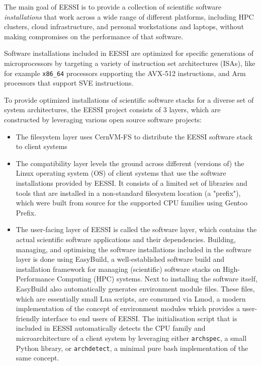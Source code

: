 The main goal of EESSI is to provide a collection of scientific software \emph{installations} that work across a wide range of
different platforms, including HPC clusters, cloud infrastructure, and personal workstations and laptops, without making
compromises on the performance of that software.

Software installations included in EESSI are optimized for specific generations of microprocessors by targeting a
variety of instruction set architectures (ISAs), like for example \texttt{x86\_64} processors supporting the
AVX-512 instructions, and Arm processors that support SVE instructions.

To provide optimized installations of scientific software stacks for a diverse set of system architectures, the EESSI
project consists of 3 layers, which are constructed by leveraging various open source software projects:
\begin{itemize}
\item The filesystem layer uses CernVM-FS to distribute the EESSI software stack to client systems
\item The compatibility layer levels the ground across different (versions of) the Linux operating system (OS)
      of client systems that use the software installations provided by EESSI. It consists of a limited set of libraries
      and tools that are installed in a non-standard filesystem location (a "prefix"), which were built from source for
      the supported CPU families using Gentoo Prefix.
\item The user-facing layer of EESSI is called the software layer, which contains the actual scientific software applications
      and their dependencies. Building, managing, and optimising the software installations included in the software
      layer is done using EasyBuild, a well-established software build and installation framework for managing
      (scientific) software stacks on High-Performance Computing (HPC) systems. Next to installing the software itself,
      EasyBuild also automatically generates environment module files. These files, which are essentially small Lua
      scripts, are consumed via Lmod, a modern implementation of the concept of environment modules which provides a
      user-friendly interface to end users of EESSI. The initialisation script that is included in EESSI
      automatically detects the CPU family and microarchitecture of a client system by leveraging either
      \texttt{archspec}, a small Python library, or \texttt{archdetect}, a minimal pure bash implementation of the same
      concept.
\end{itemize}


